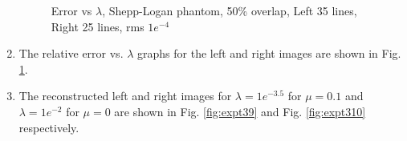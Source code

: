 \begin{enumerate}
\begin{figure}[h!]

\vspace{-0.2in}
\hspace{-0.1in}
\caption [Error vs $\lambda$, Shepp-Logan phantom, 50\% overlap,  Left 35 lines, Right 25 lines, rms $1e^{-4}$]{Error vs $\lambda$, Shepp-Logan phantom, 50\% overlap,  Left 35 lines, Right 25 lines, rms $1e^{-4}$}
\label{fig:expt38}
\end{figure}
\item The relative error vs.  $\lambda$ graphs for the left and right images are shown in Fig. \ref{fig:expt38}.
\item The reconstructed left and right images for $\lambda = 1e^{-3.5}$ for  $\mu  = 0.1 $  and $\lambda = 1e^{-2}$ for  $\mu = 0$ are shown in Fig. \ref{fig:expt39} and  Fig. \ref{fig:expt310} respectively. 



\end{enumerate}
